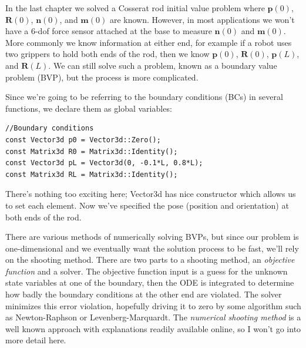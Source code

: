 \documentclass[12pt]{article}
\begin{document}
\makeatletter
\renewcommand{\@maketitle}{
\newpage
\null
\vskip 2em
\begin{center}
{\LARGE \@title \par}
\end{center}
\par
} \makeatother

\maketitle

In the last chapter we solved a Cosserat rod initial value problem where $\boldsymbol{p}(0)$, $\boldsymbol{R}(0)$, $\boldsymbol{n}(0)$, and $\boldsymbol{m}(0)$ are known. However, in most applications we won't have a 6-dof force sensor attached at the base to measure $\boldsymbol{n}(0)$ and $\boldsymbol{m}(0)$. More commonly we know information at either end, for example if a robot uses two grippers to hold both ends of the rod, then we know $\boldsymbol{p}(0)$, $\boldsymbol{R}(0)$, $\boldsymbol{p}(L)$, and $\boldsymbol{R}(L)$. We can still solve such a problem, known as a boundary value problem (BVP), but the process is more complicated.

Since we're going to be referring to the boundary conditions (BCs) in several functions, we declare them as global variables:
\begin{lstlisting}
//Boundary conditions
const Vector3d p0 = Vector3d::Zero();
const Matrix3d R0 = Matrix3d::Identity();
const Vector3d pL = Vector3d(0, -0.1*L, 0.8*L);
const Matrix3d RL = Matrix3d::Identity();
\end{lstlisting}
There's nothing too exciting here; Vector3d has nice constructor which allows us to set each element. Now we've specified the pose (position and orientation) at both ends of the rod.

There are various methods of numerically solving BVPs, but since our problem is one-dimensional and we eventually want the solution process to be fast, we'll rely on the shooting method. There are two parts to a shooting method, an \emph{objective function} and a solver. The objective function input is a guess for the unknown state variables at one of the boundary, then the ODE is integrated to determine how badly the boundary conditions at the other end are violated. The solver minimizes this error violation, hopefully driving it to zero by some algorithm such as Newton-Raphson or Levenberg-Marquardt. The \emph{numerical shooting method} is a well known approach with explanations readily available online, so I won't go into more detail here.
\end{document}
